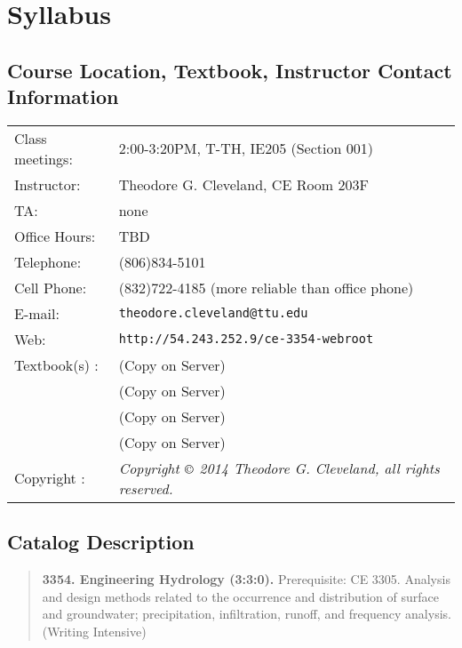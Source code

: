 \documentclass[12pt]{article}
\begin{document}
\section*{Syllabus}

\subsection*{{Course Location, Textbook, Instructor Contact Information}}
\begin{tabular}{p{1.5in}p{5.0in}}
Class meetings: &   2:00-3:20PM, T-TH, IE205 (Section 001) \\
Instructor: & Theodore G. Cleveland, CE Room 203F \\
TA: & none \\
Office Hours: & TBD \\%
Telephone: & (806)834-5101 \\
Cell Phone: & (832)722-4185 (more reliable than office phone) \\
E-mail: & \texttt{theodore.cleveland@ttu.edu}\\
Web: & \texttt{http://54.243.252.9/ce-3354-webroot}\\
Textbook(s) : & \cite{CMM1988} (Copy on Server) \\
~ & \cite{Dooge1973} (Copy on Server) \\
~ & \cite{McCuen2002} (Copy on Server) \\
~ & \cite{Viessman1977} (Copy on Server) \\
Copyright : & \textsl{Copyright $\copyright$ 2014 Theodore G. Cleveland, all rights reserved.} \\
\end{tabular}
\subsection*{{Catalog Description}}
\begin{quote} \textbf{3354. Engineering Hydrology (3:3:0).}  Prerequisite: CE 3305. Analysis and design methods related to the occurrence and distribution of surface and groundwater; precipitation, infiltration, runoff, and frequency analysis. (Writing Intensive)
\end{quote}
\end{document}
